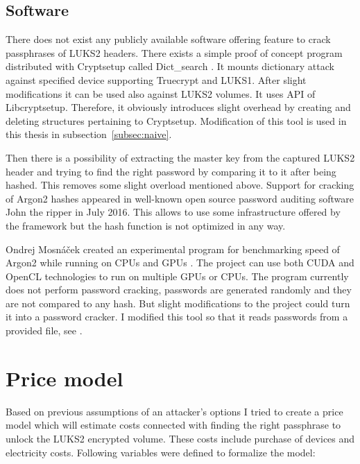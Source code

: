 \documentclass[nolof]{fithesis3}
\begin{document}
\subsection{Software}
There does not exist any publicly available software offering feature to crack passphrases of LUKS2 headers. There exists a simple proof of concept program distributed with Cryptsetup called Dict\_search \parencite{cryptsetupdictsearch}. It mounts dictionary attack against specified device supporting Truecrypt and LUKS1. After slight modifications it can be used also against LUKS2 volumes. It uses API of Libcryptsetup. Therefore, it obviously introduces slight overhead by creating and deleting structures pertaining to Cryptsetup. Modification of this tool is used in this thesis in subsection~\ref{subsec:naive}.

Then there is a possibility of extracting the master key from the captured LUKS2 header and trying to find the right password by comparing it to it after being hashed. This removes some slight overload mentioned above. Support for cracking of Argon2 hashes appeared in well-known open source password auditing software John the ripper in July 2016. This allows to use some infrastructure offered by the framework but the hash function is not optimized in any way.

Ondrej Mosnáček created an experimental program for benchmarking speed of Argon2 while running on CPUs and GPUs \parencite{argon2gpu}. The project can use both CUDA and OpenCL technologies to run on multiple GPUs or CPUs. The program currently does not perform password cracking, passwords are generated randomly and they are not compared to any hash. But slight modifications to the project could turn it into a password cracker. I modified this tool so that it reads passwords from a provided file, see \parencite{argon2gpuvojta}.

\section{Price model}
\label{sec:model}
Based on previous assumptions of an attacker's options I tried to create a price model which will estimate costs connected with finding the right passphrase to unlock the LUKS2 encrypted volume. These costs include purchase of devices and electricity costs. Following variables were defined to formalize the model:
\end{document}
